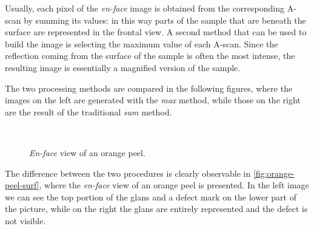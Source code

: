 Usually, each pixel of the \emph{en-face} image is obtained from the corresponding A-scan by summing its values: in this way parts of the sample that are beneath the surface are represented in the frontal view. A second method that can be used to build the image is selecting the maximum value of each A-scan. Since the reflection coming from the surface of the sample is often the most intense, the resulting image is essentially a magnified version of the sample. 

The two processing methods are compared in the following figures, where the images on the left are generated with the \emph{max} method, while those on the right are the result of the traditional \emph{sum} method. 

\begin{figure}[H]
	\myfloatalign
	\\
	\caption{\emph{En-face} view of an orange peel.}\label{fig:orange-peel-surf}
\end{figure}
The difference between the two procedures is clearly observable in \autoref{fig:orange-peel-surf}, where the \emph{en-face} view of an orange peel is presented. In the left image we can see the top portion of the glans and a defect mark on the lower part of the picture, while on the right the glans are entirely represented and the defect is not visible. 

